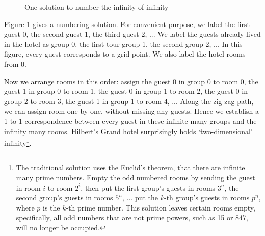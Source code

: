 \documentclass{article}
\begin{document}
\begin{figure}[htbp]
\centering
{}
\caption{One solution to number the infinity of infinity}
\label{fig:NNtoN}
\end{figure}

Figure \ref{fig:NNtoN} gives a numbering solution. For convenient purpose, we label the first guest 0, the second guest 1, the third guest 2, ... We label the guests already lived in the hotel as group 0, the first tour group 1, the second group 2, ... In this figure, every guest corresponds to a grid point. We also label the hotel rooms from 0.

Now we arrange rooms in this order: assign the guest 0 in group 0 to room 0, the guest 1 in group 0 to room 1, the guest 0 in group 1 to room 2, the guest 0 in group 2 to room 3, the guest 1 in group 1 to room 4, ... Along the zig-zag path, we can assign room one by one, without missing any guests. Hence we establish a 1-to-1 correspondence between every guest in these infinite many groups and the infinity many rooms. Hilbert's Grand hotel surprisingly holds `two-dimensional' infinity\footnote{The traditional solution uses the Euclid's theorem, that there are infinite many prime numbers. Empty the odd numbered rooms by sending the guest in room $i$ to room $2^{i}$, then put the first group's guests in rooms $3^{n}$, the second group's guests in rooms $5^{n}$, ... put the $k$-th group's guests in rooms $p^n$, where $p$ is the $k$-th prime number. This solution leaves certain rooms empty, specifically, all odd numbers that are not prime powers, such as 15 or 847, will no longer be occupied.}.
\end{document}
